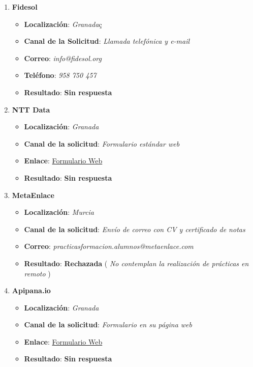 \begin{enumerate}
	\item {\large \textbf{Fidesol}}
	\begin{itemize}
		\item \textbf{Localización}: \textit{Granada}ç
		\item \textbf{Canal de la Solicitud}: \textit{Llamada telefónica y e-mail}
		\item \textbf{Correo}: \textit{info@fidesol.org}
		\item \textbf{Teléfono}: \textit{958 750 457}
		\item \textbf{Resultado}: {\color{orange} \textbf{Sin respuesta}}
	\end{itemize}
	\item {\large\textbf{NTT Data}}
		\begin{itemize}
		\item \textbf{Localización}: \textit{Granada}
		\item \textbf{Canal de la solicitud}: \textit{Formulario estándar web}
		\item \textbf{Enlace}:  \href{https://careers.emeal.nttdata.com/s/offer/a1J2p000009xQ65EAE/pr%C3%A1cticas-ntt-data?language=es}{Formulario Web}
		\item \textbf{Resultado}: {\color{orange} \textbf{Sin respuesta}}
	\end{itemize}
		\item {\large\textbf{MetaEnlace}}
	\begin{itemize}
		\item \textbf{Localización}: \textit{Murcia}
		\item \textbf{Canal de la solicitud}: \textit{Envío de correo con CV y certificado de notas}
		\item \textbf{Correo}: \textit{practicasformacion.alumnos@metaenlace.com}
		\item \textbf{Resultado}: {\color{red}\textbf{Rechazada}}  (\textit{ No contemplan la realización de prácticas en remoto} )
	\end{itemize}
		\item \textbf{Apipana.io}
		\begin{itemize}
		\item \textbf{Localización}: \textit{Granada}
		\item \textbf{Canal de la solicitud}: \textit{Formulario en su página web}
		\item \textbf{Enlace}: \href{https://apipana.io/granada/#form}{Formulario Web}
		\item \textbf{Resultado}: {\color{orange} \textbf{Sin respuesta}}

\end{itemize}
\end{enumerate}
